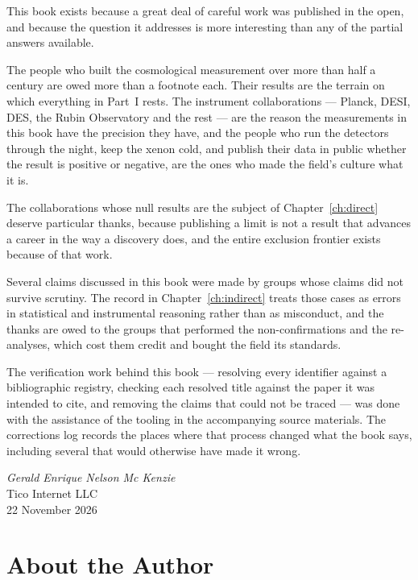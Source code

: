 This book exists because a great deal of careful work was published in the
open, and because the question it addresses is more interesting than any of
the partial answers available.

The people who built the cosmological measurement over more than half a
century are owed more than a footnote each. Their results are the terrain on
which everything in Part~I rests. The instrument collaborations --- Planck,
DESI, DES, the Rubin Observatory and the rest --- are the reason the
measurements in this book have the precision they have, and the people who
run the detectors through the night, keep the xenon cold, and publish their
data in public whether the result is positive or negative, are the ones who
made the field's culture what it is.

The collaborations whose null results are the subject of Chapter~\ref{ch:direct}
deserve particular thanks, because publishing a limit is not a result that
advances a career in the way a discovery does, and the entire exclusion
frontier exists because of that work.

Several claims discussed in this book were made by groups whose claims did
not survive scrutiny. The record in Chapter~\ref{ch:indirect} treats those
cases as errors in statistical and instrumental reasoning rather than as
misconduct, and the thanks are owed to the groups that performed the
non-confirmations and the re-analyses, which cost them credit and bought the
field its standards.

The verification work behind this book --- resolving every identifier
against a bibliographic registry, checking each resolved title against the
paper it was intended to cite, and removing the claims that could not be
traced --- was done with the assistance of the tooling in the accompanying
source materials. The corrections log records the places where that process
changed what the book says, including several that would otherwise have made
it wrong.

\begin{flushright}
\emph{Gerald Enrique Nelson Mc Kenzie}\\
Tico Internet LLC\\
22 November 2026
\end{flushright}

\chapter*{About the Author}
\thispagestyle{plain}

